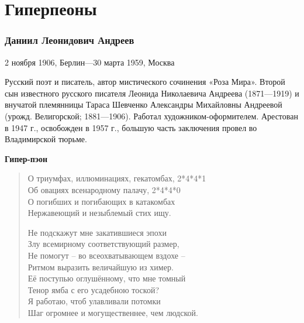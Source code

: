\documentclass{beamer}
\begin{document}
\section{Гиперпеоны}\label{sec:d}


\begin{frame}
\frametitle{Даниил Леонидович Андреев}

\begin{flushleft}
2 ноября 1906, Берлин—30 марта 1959, Москва
\end{flushleft}

\begin{flushleft}
Русский поэт и писатель, автор мистического сочинения «Роза Мира». Второй сын известного русского писателя Леонида Николаевича Андреева (1871—1919) и внучатой племянницы Тараса Шевченко Александры Михайловны Андреевой (урожд. Велигорской; 1881—1906). Работал художником-оформителем. Арестован в 1947 г., освобожден в 1957 г., большую часть заключения провел во Владимирской тюрьме.
\end{flushleft}

\end{frame}



\begin{frame}
\begin{center}
\textbf{Гипер-пэон}
\end{center}

\begin{verse}
О три\alert{у}мфах, иллюмин\alert{а}циях, гекат\alert{о}мбах,		2*4*4*1\\
Об ов\alert{а}циях всенар\alert{о}дному пал\alert{а}чу,					2*4*4*0\\
О пог\alert{и}бших и погиб\alert{а}ющих в катак\alert{о}мбах \\
Нержав\alert{е}ющий и нез\alert{ы}блемый стих ищ\alert{у}.

Не подск\alert{а}жут мне закат\alert{и}вшиеся эп\alert{о}хи\\
Злу всем\alert{и}рному соотв\alert{е}тствующий разм\alert{е}р,\\
Не пом\alert{о}гут – во всеохв\alert{а}тывающем взд\alert{о}хе –\\
Ритмом в\alert{ы}разить велич\alert{а}йшую из хим\alert{е}р.\\

Её поступью оглушённому, что мне томный\\
Тенор ямба с его усадебною тоской?\\
Я работаю, чтоб улавливали потомки\\
Шаг огромнее и могущественнее, чем людской.

\end{verse}


\end{frame}
\end{document}
